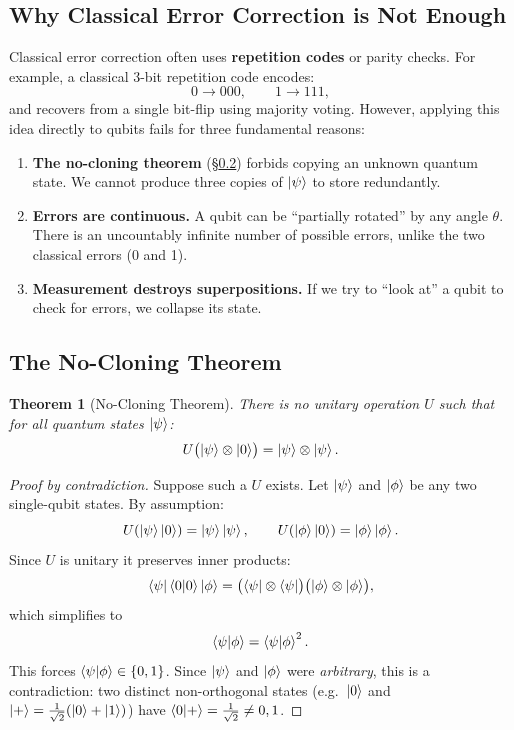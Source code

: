 \documentclass[11pt, a4paper]{article}
\theoremstyle{definition}
\theoremstyle{plain}
\newtheorem{theorem}{Theorem}[section]
\theoremstyle{remark}
\begin{document}
\subsection{Why Classical Error Correction is Not Enough}

Classical error correction often uses \textbf{repetition codes} or parity
checks.  For example, a classical 3-bit repetition code encodes:
\[
  0 \longrightarrow 000, \qquad 1 \longrightarrow 111,
\]
and recovers from a single bit-flip using majority voting.  However, applying
this idea directly to qubits fails for three fundamental reasons:

\begin{enumerate}
  \item \textbf{The no-cloning theorem} (\S\ref{sec:no-cloning}) forbids
        copying an unknown quantum state.  We cannot produce three copies of
        $\ket{\psi}$ to store redundantly.

  \item \textbf{Errors are continuous.} A qubit can be ``partially rotated''
        by any angle $\theta$.  There is an uncountably infinite number of
        possible errors, unlike the two classical errors (0 and 1).

  \item \textbf{Measurement destroys superpositions.} If we try to ``look at''
        a qubit to check for errors, we collapse its state.
\end{enumerate}

\subsection{The No-Cloning Theorem}
\label{sec:no-cloning}

\begin{theorem}[No-Cloning Theorem]
There is no unitary operation $U$ such that for \emph{all} quantum states
$\ket{\psi}$:
\[
  U\bigl(\ket{\psi} \otimes \ket{0}\bigr) = \ket{\psi} \otimes \ket{\psi}.
\]
\end{theorem}

\begin{proof}[Proof by contradiction]
Suppose such a $U$ exists.  Let $\ket{\psi}$ and $\ket{\phi}$ be any two
single-qubit states.  By assumption:
\[
  U(\ket{\psi}\ket{0}) = \ket{\psi}\ket{\psi}, \qquad
  U(\ket{\phi}\ket{0}) = \ket{\phi}\ket{\phi}.
\]
Since $U$ is unitary it preserves inner products:
\[
  \bra{\psi}\braket{0|0}\ket{\phi}
  = \bigl(\bra{\psi}\otimes\bra{\psi}\bigr)\bigl(\ket{\phi}\otimes\ket{\phi}\bigr),
\]
which simplifies to
\[
  \braket{\psi|\phi} = \braket{\psi|\phi}^2.
\]
This forces $\braket{\psi|\phi} \in \{0, 1\}$.  Since $\ket{\psi}$ and
$\ket{\phi}$ were \emph{arbitrary}, this is a contradiction: two distinct
non-orthogonal states (e.g.\ $\ket{0}$ and $\ket{+} = \tfrac{1}{\sqrt{2}}
(\ket{0}+\ket{1})$) have $\braket{0|+} = \tfrac{1}{\sqrt{2}} \neq 0, 1$.
\end{proof}
\end{document}
